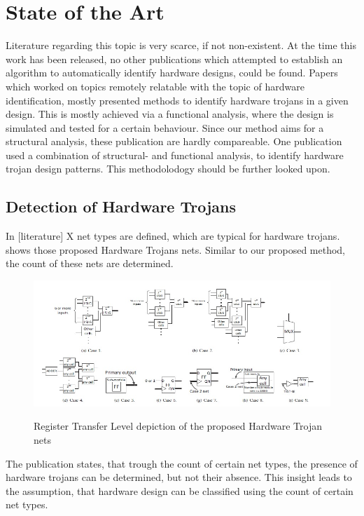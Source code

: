 
\section{State of the Art}
Literature regarding this topic is very scarce, if not non-existent. At the time
this work has been released, no other publications which attempted to establish 
an algorithm to automatically identify hardware designs, could be found.
Papers which worked on topics remotely relatable with the topic of hardware 
identification, mostly presented methods to identify hardware trojans in a given 
design. This is mostly achieved via a functional analysis, where the design is 
simulated and tested for a certain behaviour. Since our method aims for a 
structural analysis, these publication are hardly compareable. 
One publication used a combination of structural- and functional analysis, to 
identify hardware trojan design patterns. This methodolodogy should be further 
looked upon.  

\subsection{Detection of Hardware Trojans}
In [literature] X net types are defined, which are typical for hardware trojans.
\label{hw_trojan_nets} shows those proposed Hardware Trojans nets. Similar to 
our proposed method, the count of these nets are determined. 
 
\begin{figure}[h]
    \includegraphics[width=\textwidth,keepaspectratio]{../pictures/hw_trojan_nets.jpg}
    \label{hw_trojans_nets}
    \caption{Register Transfer Level depiction of the proposed Hardware Trojan nets}
\end{figure}

The publication states, that trough the count of certain net types, the presence
of hardware trojans can be determined, but not their absence.
This insight leads to the assumption, that hardware design can be classified 
using the count of certain net types. 




